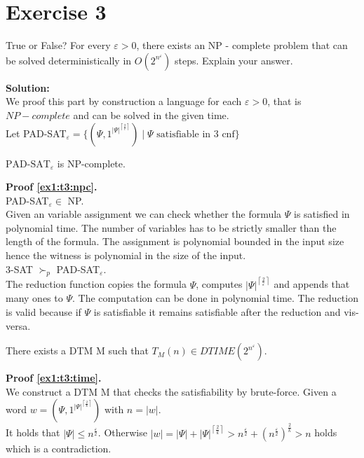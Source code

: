 \section*{Exercise 3}

True or False? For every $\varepsilon > 0$, there exists an NP - complete problem that can be solved deterministically in
$O(2^{n^\varepsilon})$ steps. Explain your answer.

\textbf{Solution:}\\

We proof this part by construction a language for each $\varepsilon > 0$, that is $NP - complete$ and can be solved in
the given time.\\

Let PAD-SAT$_\varepsilon = \{ (\Psi , 1^{|\Psi|^{\left\lceil \frac{2}{\varepsilon} \right\rceil}}) \; | \; \Psi \text{ satisfiable in 3 cnf} \}$\\

\begin{lemma}\label{ex1:t3:npc}
	$\text{PAD-SAT}_\varepsilon$ is NP-complete.
\end{lemma}

\textbf{Proof \ref{ex1:t3:npc}.}\\
PAD-SAT$_\varepsilon \in$ NP.\\
Given an variable assignment we can check whether the formula $\Psi$ is satisfied in polynomial time. 
The number of variables has to be strictly smaller than the length of the formula. The assignment is polynomial bounded
in the input size hence the witness is polynomial in the size of the input.\\

3-SAT $\succ_p$ PAD-SAT$_\varepsilon$.\\
The reduction function copies the formula $\Psi$, computes $|\Psi|^{\left\lceil \frac{2}{\varepsilon} \right\rceil}$
and appends that many ones to $\Psi$. The computation can be done in polynomial time.
The reduction is valid because if $\Psi$ is satisfiable it remains satisfiable after the reduction and vis-versa.

\begin{lemma}\label{ex1:t3:time}
    There exists a DTM M such that $T_M(n) \in DTIME (2^{n^\varepsilon})$.
\end{lemma}

\textbf{Proof \ref{ex1:t3:time}.}\\
We construct a DTM M that checks the satisfiability by brute-force.
Given a word $w = (\Psi, 1^{|\Psi|^{\left\lceil \frac{2}{k} \right\rceil}})$ with $n = |w|$.\\
It holds that $|\Psi| \leq n^\frac{\varepsilon}{2}$. Otherwise 
$|w| = |\Psi| + |\Psi|^{\left\lceil \frac{2}{k} \right\rceil} > n^\frac{\varepsilon}{2} + (n^\frac{\varepsilon}{2})^{\frac{2}{k}} > n$
holds which is a contradiction.\\

